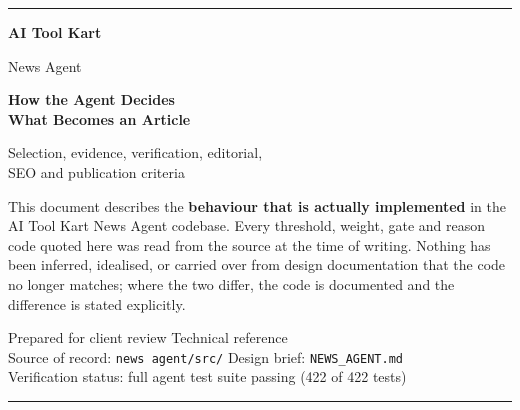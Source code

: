 \documentclass[11pt,a4paper]{article}
\newcommand{\file}[1]{\textcolor{aitkGray}{\texttt{\footnotesize\hyphenpenalty=0\exhyphenpenalty=0\relax #1}}}
\begin{document}
\hypersetup{pageanchor=false}
\begin{titlepage}
\centering
\vspace*{2.2cm}

{\color{aitkAccent}\rule{4cm}{2.5pt}}

\vspace{1.4cm}
{\Huge\bfseries\color{aitkNavy} AI Tool Kart\par}
\vspace{0.35cm}
{\LARGE\color{aitkNavy} News Agent\par}

\vspace{1.8cm}
{\Large\bfseries How the Agent Decides\\[0.25em] What Becomes an Article\par}

\vspace{0.9cm}
{\large\color{aitkGray} Selection, evidence, verification, editorial,\\
SEO and publication criteria\par}

\vspace{2.2cm}

\begin{tcolorbox}[enhanced, width=0.82\textwidth, colback=aitkSoft,
  colframe=aitkLine, boxrule=0.6pt, arc=3pt, left=14pt, right=14pt,
  top=12pt, bottom=12pt]
\centering\small
This document describes the \textbf{behaviour that is actually implemented} in the
AI Tool Kart News Agent codebase. Every threshold, weight, gate and reason code
quoted here was read from the source at the time of writing. Nothing has been
inferred, idealised, or carried over from design documentation that the code no
longer matches; where the two differ, the code is documented and the difference
is stated explicitly.
\end{tcolorbox}

\vfill

{\small\color{aitkGray}
Prepared for client review \quad\textbullet\quad Technical reference\\[0.3em]
Source of record: \file{news agent/src/} \quad\textbullet\quad Design brief: \file{NEWS\_AGENT.md}\\[0.3em]
Verification status: full agent test suite passing (422 of 422 tests)
\par}

\vspace{1.2cm}
{\color{aitkAccent}\rule{4cm}{2.5pt}}
\end{titlepage}
\end{document}
